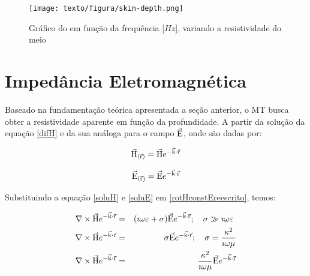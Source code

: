         \begin{figure}[H]
            \caption[Gráfico do ]{Gráfico do  em função da frequência [$Hz$], variando a resistividade do meio}
            \begin{center}
                \texttt{[image: texto/figura/skin-depth.png]}
            \end{center}
            \label{fig-skin-depth}
        \end{figure}
        
    \section{Impedância Eletromagnética}
        
        Baseado na fundamentação teórica apresentada a seção anterior, o MT busca obter a resistividade aparente em função da profundidade. A partir da solução da equação \ref{difH} e da sua análoga para o campo $\vec{\textrm{E}}$, onde são dadas por:
        
        \begin{equation}
            \label{soluH}
            \vec{\textrm{H}}_{(\vec{\textrm{r}})} = \vec{\textrm{H}} e^{-\vec{\textrm{k}} \cdot \vec{\textrm{r}}}
        \end{equation}

        \begin{equation}
            \label{soluE}
            \vec{\textrm{E}}_{(\vec{\textrm{r}})} = \vec{\textrm{E}} e^{-\vec{\textrm{k}} \cdot \vec{\textrm{r}}}
        \end{equation}

        
        Substituindo a equação \ref{soluH} e \ref{soluE} em \ref{rotHconstEreescrito}, temos:
        
        {\setlength\arraycolsep{2pt}
        \begin{eqnarray}
            \label{HEpossolu}
            \nabla \times \vec{\textrm{H}}e^{-\vec{\textrm{k}} \cdot \vec{\textrm{r}}} & = & (\imath \omega \varepsilon + \sigma) \vec{\textrm{E}}e^{-\vec{\textrm{k}} \cdot \vec{\textrm{r}}}; \quad \sigma \gg \imath \omega \varepsilon \ \nonumber \\
            \nabla \times \vec{\textrm{H}}e^{-\vec{\textrm{k}} \cdot \vec{\textrm{r}}} & = & \sigma \vec{\textrm{E}}e^{-\vec{\textrm{k}} \cdot \vec{\textrm{r}}}; \quad \sigma = \dfrac{\kappa^2}{\imath \omega \mu} \nonumber \\
            \nabla \times \vec{\textrm{H}}e^{-\vec{\textrm{k}} \cdot \vec{\textrm{r}}} & = &\dfrac{\kappa^2}{\imath \omega \mu} \vec{\textrm{E}}e^{-\vec{\textrm{k}} \cdot \vec{\textrm{r}}}
        \end{eqnarray}} 
        
